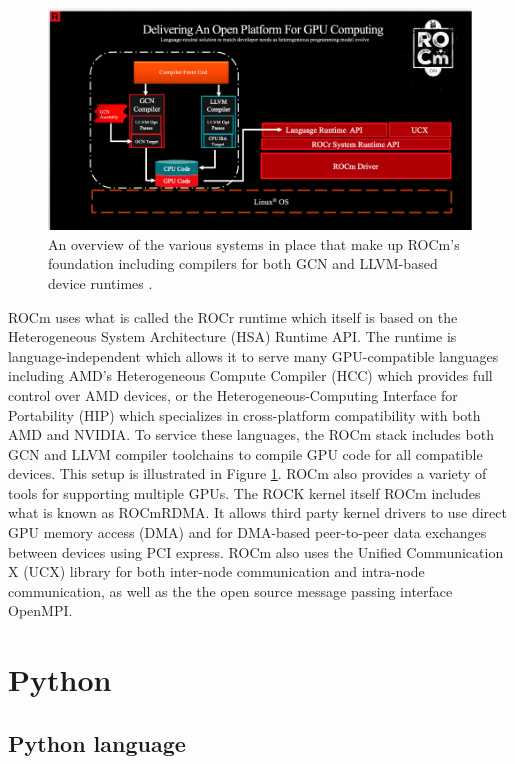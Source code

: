 \begin{figure}[hbtp]
\includegraphics[width=\textwidth]{figures/ROCm_Stack.png}
\centering
\caption{An overview of the various systems in place that make up ROCm's foundation including compilers for both GCN and LLVM-based device runtimes \cite{rocmDocs}.}
\label{rocm1}
\end{figure}

\quad ROCm uses what is called the ROCr runtime which itself is based on the Heterogeneous System Architecture (HSA) Runtime API. The runtime is language-independent which allows it to serve many GPU-compatible languages including AMD's Heterogeneous Compute Compiler (HCC) which provides full control over AMD devices, or the Heterogeneous-Computing Interface for Portability (HIP) which specializes in cross-platform compatibility with both AMD and NVIDIA. To service these languages, the ROCm stack includes both GCN and LLVM compiler toolchains to compile GPU code for all compatible devices. This setup is illustrated in Figure \ref{rocm1}. ROCm also provides a variety of tools for supporting multiple GPUs. The ROCK kernel itself ROCm includes what is known as ROCmRDMA. It allows third party kernel drivers to use direct GPU memory access (DMA) and for DMA-based peer-to-peer data exchanges between devices using PCI express. ROCm also uses the Unified Communication X (UCX) library for both inter-node communication and intra-node communication, as well as the the open source message passing interface OpenMPI. 

\section{Python}

\subsection{Python language}


